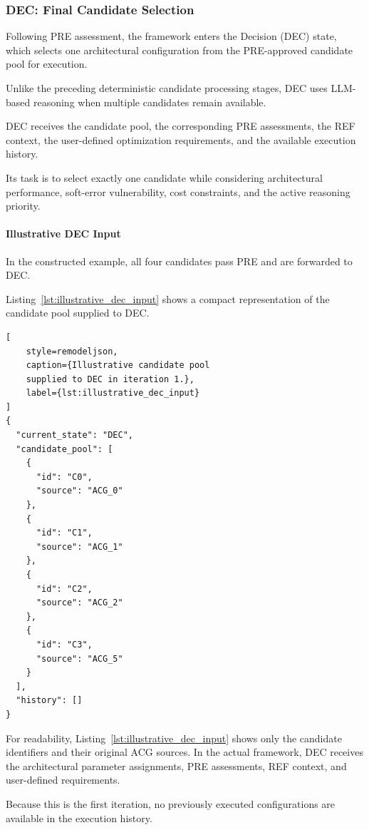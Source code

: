 \subsubsection{DEC: Final Candidate Selection}
\label{app:illustrative_dec}

Following PRE assessment, the framework enters
the Decision (DEC) state, which selects one
architectural configuration from the
PRE-approved candidate pool for execution.

Unlike the preceding deterministic candidate
processing stages, DEC uses LLM-based reasoning
when multiple candidates remain available.

DEC receives the candidate pool, the
corresponding PRE assessments, the REF context,
the user-defined optimization requirements,
and the available execution history.

Its task is to select exactly one candidate
while considering architectural performance,
soft-error vulnerability, cost constraints,
and the active reasoning priority.

\paragraph{Illustrative DEC Input}

In the constructed example, all four
candidates pass PRE and are forwarded to DEC.

Listing~\ref{lst:illustrative_dec_input}
shows a compact representation of the
candidate pool supplied to DEC.

\begin{lstlisting}[
    style=remodeljson,
    caption={Illustrative candidate pool
    supplied to DEC in iteration 1.},
    label={lst:illustrative_dec_input}
]
{
  "current_state": "DEC",
  "candidate_pool": [
    {
      "id": "C0",
      "source": "ACG_0"
    },
    {
      "id": "C1",
      "source": "ACG_1"
    },
    {
      "id": "C2",
      "source": "ACG_2"
    },
    {
      "id": "C3",
      "source": "ACG_5"
    }
  ],
  "history": []
}
\end{lstlisting}

For readability, Listing~\ref{lst:illustrative_dec_input}
shows only the candidate identifiers and their
original ACG sources. In the actual framework,
DEC receives the architectural parameter
assignments, PRE assessments, REF context,
and user-defined requirements.

Because this is the first iteration, no
previously executed configurations are
available in the execution history.

